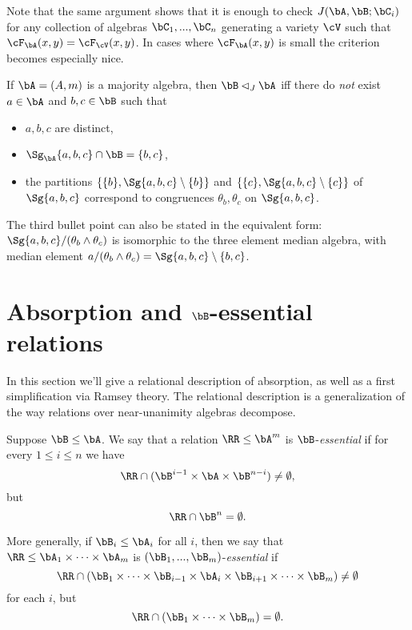 Note that the same argument shows that it is enough to check $J(\bA,\bB;\bC_i)$ for any collection of algebras $\bC_1, ..., \bC_n$ generating a variety $\cV$ such that $\cF_\bA(x,y) = \cF_{\cV}(x,y)$. In cases where $\cF_\bA(x,y)$ is small the criterion becomes especially nice.


\begin{cor} If $\bA = (A,m)$ is a majority algebra, then $\bB \lhd_J \bA$ iff there do \emph{not} exist $a\in \bA$ and $b,c \in \bB$ such that
\begin{itemize}
\item $a,b,c$ are distinct,
\item $\Sg_\bA\{a,b,c\} \cap \bB = \{b,c\}$,
\item the partitions $\{\{b\},\Sg\{a,b,c\}\setminus \{b\}\}$ and $\{\{c\},\Sg\{a,b,c\}\setminus \{c\}\}$ of $\Sg\{a,b,c\}$ correspond to congruences $\theta_b, \theta_c$ on $\Sg\{a,b,c\}$.
\end{itemize}
The third bullet point can also be stated in the equivalent form: $\Sg\{a,b,c\}/(\theta_b\wedge\theta_c)$ is isomorphic to the three element median algebra, with median element $a/(\theta_b \wedge \theta_c) = \Sg\{a,b,c\}\setminus\{b,c\}$.
\end{cor}



\section{Absorption and $\bB$-essential relations}

In this section we'll give a relational description of absorption, as well as a first simplification via Ramsey theory. The relational description is a generalization of the way relations over near-unanimity algebras decompose.

\begin{defn} Suppose $\bB \le \bA$. We say that a relation $\RR \le \bA^m$ is $\bB$-\emph{essential} if for every $1 \le i \le n$ we have
\[
\RR \cap (\bB^{i-1} \times \bA \times \bB^{n-i}) \ne \emptyset,
\]
but
\[
\RR \cap \bB^n = \emptyset.
\]

More generally, if $\bB_i \le \bA_i$ for all $i$, then we say that $\RR \le \bA_1 \times \cdots \times \bA_m$ is $(\bB_1, ..., \bB_m)$-\emph{essential} if
\[
\RR \cap (\bB_1 \times \cdots \times \bB_{i-1} \times \bA_i \times \bB_{i+1} \times \cdots \times \bB_m) \ne \emptyset
\]
for each $i$, but
\[
\RR \cap (\bB_1 \times \cdots \times \bB_m) = \emptyset.
\]
\end{defn}

